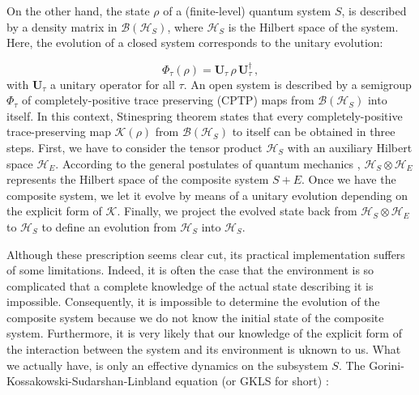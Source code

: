 \documentclass[11pt]{article}
\newcommand{\be}{\begin{equation}}
\newcommand{\ee}{\end{equation}}
\newcommand{\vsp}{\vspace{0.4cm}}
\begin{document}
On the other hand, the state $\rho$ of a (finite-level) quantum system $\mathit{S}$, is described by a density matrix in $\mathcal{B}(\mathcal{H}_{\mathit{S}})$, where $\mathcal{H}_{\mathit{S}}$ is the Hilbert space of the system.
Here, the evolution of a closed system corresponds to the unitary evolution:

\be
\Phi_{\tau}(\rho)=\mathbf{U}_{\tau}\,\rho\,\mathbf{U}_{\tau}^{\dagger}\,,
\ee
with $\mathbf{U}_{\tau}$ a unitary operator for all $\tau$.
An open system is described by a semigroup $\Phi_{\tau}$ of completely-positive trace preserving (CPTP) maps from $\mathcal{B}(\mathcal{H}_{\mathit{S}})$ into itself.
In this context, Stinespring theorem \cite{stinespring-positive_functions_on_cstar_algebras} states that every completely-positive trace-preserving map $\mathcal{K}(\rho)$ from $\mathcal{B}(\mathcal{H}_{\mathit{S}})$ to itself can be obtained in three steps.
First, we have to consider the tensor product $\mathcal{H}_{\mathit{S}}$ with an auxiliary Hilbert space $\mathcal{H}_{\mathit{E}}$.
According to the general postulates of quantum mechanics \cite{dirac-principles_of_quantum_mechanics}, $\mathcal{H}_{\mathit{S}}\otimes\mathcal{H}_{\mathit{E}}$ represents the Hilbert space of the composite system $\mathit{S} + \mathit{E}$.
Once we have the composite system, we let it evolve  by means of a unitary evolution depending on the explicit form of $\mathcal{K}$.
Finally, we project the evolved state back from $\mathcal{H}_{\mathit{S}}\otimes\mathcal{H}_{\mathit{E}}$ to $\mathcal{H}_{\mathit{S}}$ to define an evolution from $\mathcal{H}_{\mathit{S}}$ into $\mathcal{H}_{\mathit{S}}$.


\vsp

Although these prescription seems clear cut, its practical implementation suffers of some limitations.
Indeed, it is often the case that the environment is so complicated that a complete knowledge of the actual state describing it is impossible.
Consequently, it is impossible to determine the evolution of the composite system because we do not know the initial state of the composite system.
Furthermore, it is very likely that our knowledge of the explicit form of the interaction between the system and its environment is   uknown to us.
What we actually have, is only an effective dynamics on the subsystem $\mathit{S}$.
The Gorini-Kossakowski-Sudarshan-Linbland equation (or GKLS for short) \cite{gorini_kossakowski_sudarshan-completely_positive_dynamical_semigroups_of_N-level_systems,lindblad-on_the_generators_of_quantum_dynamical_semigroups}:
\end{document}
